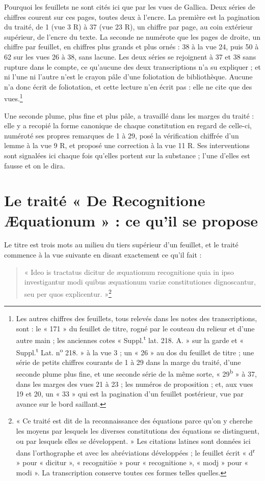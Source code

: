 \documentclass[11pt,a4paper]{article}
\begin{document}
Pourquoi les feuillets ne sont cités ici que par les vues de Gallica. Deux
séries de chiffres courent sur ces pages, toutes deux à l'encre. La première est
la pagination du traité, de 1 (vue 3 R) à 37 (vue 23 R), un chiffre par page, au
coin extérieur supérieur, de l'encre du texte. La seconde ne numérote que les
pages de droite, un chiffre par feuillet, en chiffres plus grands et plus
ornés : 38 à la vue 24, puis 50 à 62 sur les vues 26 à 38, sans lacune. Les deux
séries se rejoignent à 37 et 38 sans rupture dans le compte, ce qu'aucune des
deux transcriptions n'a su expliquer ; et ni l'une ni l'autre n'est le crayon
pâle d'une foliotation de bibliothèque. Aucune n'a donc écrit de foliotation, et
cette lecture n'en écrit pas : elle ne cite que des vues.\footnote{Les autres
chiffres des feuillets, tous relevés dans les notes des transcriptions, sont : le
« 171 » du feuillet de titre, rogné par le couteau du relieur et d'une autre
main ; les anciennes cotes « Suppl.\textsuperscript{t} lat. 218. A. » sur la
garde et « Suppl.\textsuperscript{t} Lat. n\textsuperscript{o} 218. » à la vue 3 ;
un « 26 » au dos du feuillet de titre ; une série de petits chiffres courants de
1 à 29 dans la marge du traité, d'une seconde plume plus fine, et une seconde
série de la même sorte, « 29\textsuperscript{b} » à 37, dans les marges des vues
21 à 23 ; les numéros de proposition ; et, aux vues 19 et 20, un « 33 » qui est
la pagination d'un feuillet postérieur, vue par avance sur le bord saillant.}

Une seconde plume, plus fine et plus pâle, a travaillé dans les marges du
traité : elle y a recopié la forme canonique de chaque constitution en regard de
celle-ci, numéroté ses propres remarques de 1 à 29, posé la vérification chiffrée
d'un lemme à la vue 9 R, et proposé une correction à la vue 11 R. Ses
interventions sont signalées ici chaque fois qu'elles portent sur la substance ;
l'une d'elles est fausse et on le dira.

\section*{Le traité « De Recognitione Æquationum » : ce qu'il se propose}

Le titre est trois mots au milieu du tiers supérieur d'un feuillet, et le traité
commence à la vue suivante en disant exactement ce qu'il fait :

\begin{quote}
« Ideo is tractatus dicitur de æquationum recognitione quia in ipso
investigantur modi quibus æquationum variæ constitutiones dignoscantur, seu per
quos explicentur. »\footnote{« Ce traité est dit de la reconnaissance des
équations parce qu'on y cherche les moyens par lesquels les diverses
constitutions des équations se distinguent, ou par lesquels elles se
développent. » Les citations latines sont données ici dans l'orthographe et avec
les abréviations développées ; le feuillet écrit « d\textsuperscript{r} » pour
« dicitur », « recognitiōe » pour « recognitione », « modj » pour « modi ». La
transcription conserve toutes ces formes telles quelles.}
\end{quote}
\end{document}
